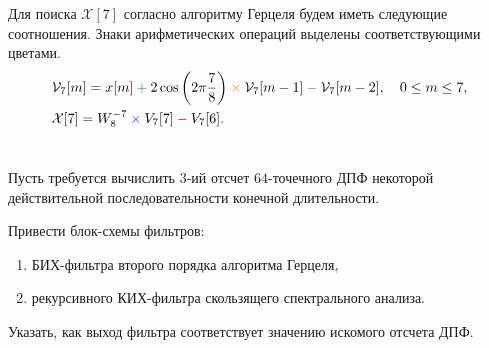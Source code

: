 Для поиска $\mathcal{X}[7]$ согласно алгоритму Герцеля будем иметь следующие соотношения. Знаки арифметических операций выделены соответствующими цветами.
\begin{align*}
&\mathcal{V}_7[m] = x[m] \color{teal}+\color{black} 2\cos\left(2\pi \dfrac{7}{8}\right)  \color{orange}\times\color{black} \mathcal{V}_7[m-1] \color{teal}-\color{black} \mathcal{V}_7[m-2],\quad 0\leq m \leq 7,\\
&\mathcal{X}[7] = W^{-7}_8 \color{blue}\times\color{black} V_7[7] \color{red}-\color{black} V_7[6].
\end{align*}


\newpage
\section{}
Пусть требуется вычислить $3$-ий отсчет $64$-точечного ДПФ некоторой действительной последовательности конечной длительности.

Привести блок-схемы фильтров:
\begin{enumerate}[label=(\alph*)]
	\item БИХ-фильтра второго порядка алгоритма Герцеля,
	\item рекурсивного КИХ-фильтра скользящего спектрального анализа.
\end{enumerate}
Указать, как выход фильтра соответствует значению искомого отсчета ДПФ.


